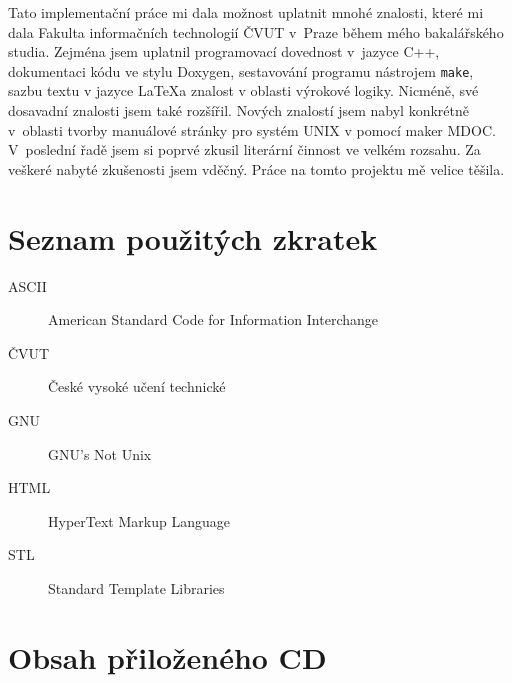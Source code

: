 \documentclass[thesis=B,czech,hidelinks]{thesis}[2012/06/26]
\begin{document}
%
%
%

\begin{conclusion}
Tato implementační práce mi dala možnost uplatnit mnohé znalosti, které mi dala Fakulta informačních technologií ČVUT v~Praze během mého bakalářského studia. Zejména jsem uplatnil programovací dovednost v~jazyce C++, dokumentaci kódu ve stylu Doxygen, sestavování programu nástrojem \texttt{make}, sazbu textu v jazyce \LaTeX a znalost v oblasti výrokové logiky. Nicméně, své dosavadní znalosti jsem také rozšířil. Nových znalostí jsem nabyl konkrétně v~oblasti tvorby manuálové stránky pro systém UNIX v pomocí maker MDOC. V~poslední řadě jsem si poprvé zkusil literární činnost ve velkém rozsahu. Za veškeré nabyté zkušenosti jsem vděčný. Práce na tomto projektu mě velice těšila.
\end{conclusion}

%
%
%




\appendix

%
%
%

\chapter{Seznam použitých zkratek}

\begin{description}
	\item[ASCII] American Standard Code for Information Interchange
	\item[ČVUT] České vysoké učení technické
	\item[GNU] GNU's Not Unix
	\item[HTML] HyperText Markup Language
	\item[STL] Standard Template Libraries
\end{description}

%
%
%

\chapter{Obsah přiloženého CD}

\begin{figure}
\end{figure}
\end{document}
